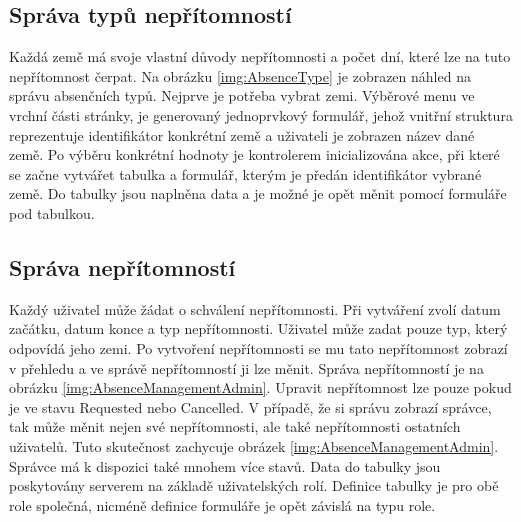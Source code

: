 \subsection{Správa typů nepřítomností}
Každá země má svoje vlastní důvody nepřítomnosti a počet dní, které lze na tuto nepřítomnost čerpat. Na obrázku \ref{img:AbsenceType} je zobrazen náhled na správu absenčních typů. Nejprve je potřeba vybrat zemi. Výběrové menu ve vrchní části stránky, je generovaný jednoprvkový formulář,  jehož vnitřní struktura reprezentuje identifikátor konkrétní země a uživateli je zobrazen název dané země. Po výběru konkrétní hodnoty je kontrolerem inicializována akce, při které se začne vytvářet tabulka a formulář, kterým je předán identifikátor vybrané země. Do tabulky jsou naplněna data a je možné je opět měnit pomocí formuláře pod tabulkou.
\subsection{Správa nepřítomností}
Každý uživatel může žádat o schválení nepřítomnosti. Při vytváření zvolí datum začátku, datum konce a typ nepřítomnosti. Uživatel může zadat pouze typ, který odpovídá jeho zemi. Po vytvoření nepřítomnosti se mu tato nepřítomnost zobrazí v přehledu a ve správě nepřítomností ji lze měnit. Správa nepřítomností je na obrázku \ref{img:AbsenceManagementAdmin}. Upravit nepřítomnost lze pouze pokud je ve stavu Requested nebo Cancelled. V případě, že si správu zobrazí správce, tak může měnit nejen své nepřítomnosti, ale také nepřítomnosti ostatních uživatelů. Tuto skutečnost zachycuje obrázek \ref{img:AbsenceManagementAdmin}. Správce má k dispozici také mnohem více stavů. Data do tabulky jsou poskytovány serverem na základě uživatelských rolí. Definice tabulky je pro obě role společná, nicméně definice formuláře je opět závislá na typu role. 

